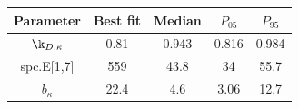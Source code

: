 \begin{tabular}{ccccc}
\toprule
Parameter & Best fit & Median & $P_{05}$ & $P_{95}$\\
\midrule
$\k_{D,\kappa}$ & 0.81 & 0.943 & 0.816 & 0.984\\
spc.E[1,7] & 559 & 43.8 & 34 & 55.7\\
$b_{\kappa}$ & 22.4 & 4.6 & 3.06 & 12.7\\
\bottomrule
\end{tabular}
